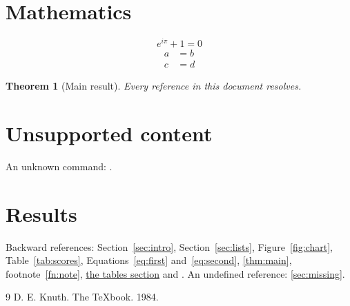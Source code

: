 \documentclass{article}
\newtheorem{theorem}{Theorem}
\begin{document}
\section{Mathematics}\label{sec:math}
\begin{equation}
e^{i\pi} + 1 = 0 \label{eq:euler}
\end{equation}
\begin{align}
a &= b \label{eq:first} \\
c &= d \label{eq:second}
\end{align}
\begin{theorem}[Main result]\label{thm:main}
Every reference in this document resolves.
\end{theorem}

\section{Unsupported content}\label{sec:unsupported}
An unknown command: .

\section{Results}\label{sec:results}
Backward references: Section~\ref{sec:intro}, Section~\ref{sec:lists}, Figure~\ref{fig:chart},
Table~\ref{tab:scores}, Equations~\eqref{eq:first} and~\eqref{eq:second}, \autoref{thm:main},
footnote~\ref{fn:note}, \hyperref[sec:tables]{the tables section} and \cite{knuth}.
An undefined reference: \ref{sec:missing}.
\begin{thebibliography}{9}
 D. E. Knuth. The \TeX book. 1984.
\end{thebibliography}
\end{document}
